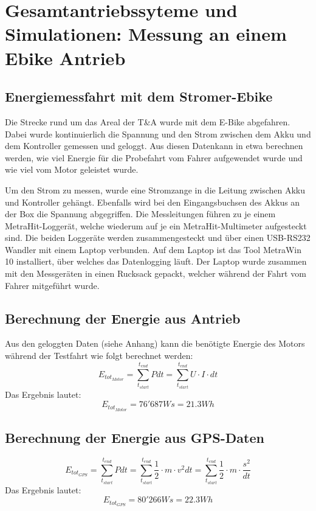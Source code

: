 \documentclass[a4,paper,fleqn]{article}
\begin{document}
\section{Gesamtantriebssyteme und Simulationen: Messung an einem Ebike Antrieb}

\subsection{Energiemessfahrt mit dem Stromer-Ebike}
Die Strecke rund um das Areal der T\&A wurde mit dem E-Bike abgefahren. Dabei 
wurde kontinuierlich die Spannung und den Strom zwischen dem Akku und dem 
Kontroller gemessen und geloggt. Aus diesen Datenkann in etwa berechnen 
werden, wie viel Energie für die Probefahrt vom Fahrer aufgewendet wurde und 
wie viel vom Motor geleistet wurde.

\noindent
Um den Strom zu messen, wurde eine Stromzange in die Leitung zwischen Akku und 
Kontroller gehängt. Ebenfalls wird bei den Eingangsbuchsen des Akkus an der 
Box die Spannung abgegriffen. Die Messleitungen führen zu je einem 
MetraHit-Loggerät, welche wiederum auf je ein MetraHit-Multimeter aufgesteckt 
sind. Die beiden Loggeräte werden zusammengesteckt und über einen USB-RS232 
Wandler mit einem Laptop verbunden. Auf dem Laptop ist das Tool MetraWin 10 
installiert, über welches das Datenlogging läuft. Der Laptop wurde zusammen 
mit den Messgeräten in einen Rucksack gepackt, welcher während der Fahrt vom 
Fahrer mitgeführt wurde.

\subsection{Berechnung der Energie aus Antrieb}
Aus den geloggten Daten (siehe Anhang) kann die benötigte Energie des Motors 
während der Testfahrt wie folgt berechnet werden:
\[ E_{tot_{Motor}} = \sum\limits_{t_{start}}^{t_{end}} P dt 
= \sum\limits_{t_{start}}^{t_{end}}  U \cdot I \cdot dt \]
Das Ergebnis lautet: 
\[ E_{tot_{Motor}} = 76'687 Ws = 21.3 Wh \]

\subsection{Berechnung der Energie aus GPS-Daten}
\[ E_{tot_{GPS}} = \sum\limits_{t_{start}}^{t_{end}} P dt 
= \sum\limits_{t_{start}}^{t_{end}} \frac{1}{2} \cdot m \cdot v^2 dt
= \sum\limits_{t_{start}}^{t_{end}} \frac{1}{2} \cdot m \cdot \frac{s^2}{dt} \]
Das Ergebnis lautet:
\[ E_{tot_{GPS}} = 80'266Ws = 22.3Wh \]
\end{document}
